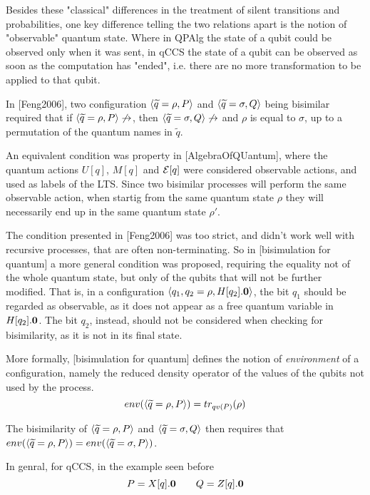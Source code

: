 Besides these "classical" differences in the treatment of silent transitions and probabilities, one key difference telling the two relations apart is the notion of "observable" quantum state. Where in QPAlg the state of a qubit could be observed only when it was sent, in qCCS the state of a qubit can be observed as soon as the computation has "ended", i.e. there are no more transformation to be applied to that qubit.

In  [Feng2006], two configuration $\langle\widetilde{q} = \rho, P\rangle$ and $\langle\widetilde{q} = \sigma, Q\rangle$ being bisimilar required that if $\langle\widetilde{q} = \rho, P\rangle \not\rightarrow$, then $\langle\widetilde{q} = \sigma, Q\rangle \not\rightarrow$ and $\rho$ is equal to $\sigma$, up to a permutation of the quantum names in $\widetilde{q}$. 

An equivalent condition was property in [AlgebraOfQUantum], where the quantum actions $U[q]$, $M[q]$ and $\mathcal{E}[q]$ were considered observable actions, and used as labels of the LTS. Since two bisimilar processes will perform the same observable action, when startig from the same quantum state $\rho$ they will necessarily end up in the same quantum state $\rho'$.

The condition presented in [Feng2006] was too strict, and didn't work well with recursive processes, that are often non-terminating. So in [bisimulation for quantum] a more general condition was proposed, requiring the equality not of the whole quantum state, but only of the qubits that will not be further modified. That is, in a configuration $\langle q_1, q_2 = \rho, H[q_2].\mathbf{0}\rangle$, the bit $q_1$ should be regarded as observable, as it does not appear as a free quantum variable in $H[q_2].\mathbf{0}$. The bit $q_2$, instead, should not be considered when checking for bisimilarity, as it is not in its final state.

More formally, [bisimulation for quantum] defines the notion of \textit{environment} of a configuration, namely the reduced density operator of the values of the qubits not used by the process.
\[env(\langle\widetilde{q} = \rho, P\rangle) = tr_{qv(P)}(\rho)\]


The bisimilarity of $\langle\widetilde{q} = \rho, P\rangle $ and $\langle\widetilde{q} = 	\sigma, Q\rangle$ then requires that 
$env(\langle\widetilde{q} = \rho, P\rangle) = env(\langle\widetilde{q} = \sigma, P\rangle)$.



In genral, for qCCS, in the example seen before
\[ P = X[q].\mathbf{0} \qquad Q = Z[q].\mathbf{0}\]

